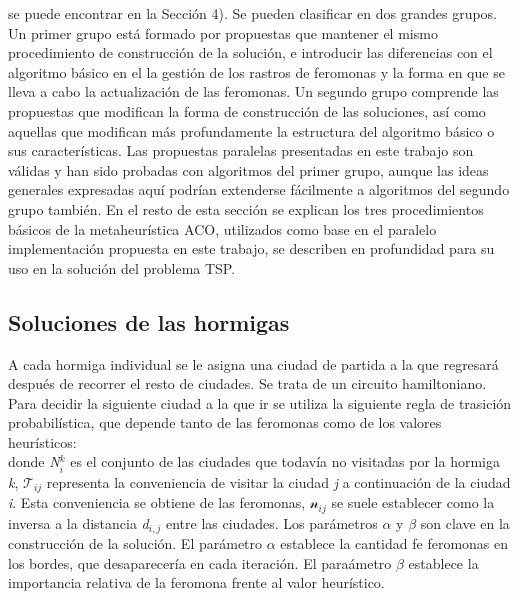se puede encontrar en la Secci\'on 4). Se pueden clasificar en dos grandes grupos. Un primer grupo est\'a formado por propuestas que
mantener el mismo procedimiento de construcci\'on de la soluci\'on, e introducir las diferencias con el algoritmo b\'asico en el
la gesti\'on de los rastros de feromonas y la forma en que se lleva a cabo la actualizaci\'on de las feromonas. Un segundo grupo comprende
las propuestas que modifican la forma de construcci\'on de las soluciones, as\'i como aquellas que modifican m\'as profundamente la
estructura del algoritmo b\'asico o sus caracter\'isticas. Las propuestas paralelas presentadas en este trabajo son v\'alidas y han sido
probadas con algoritmos del primer grupo, aunque las ideas generales expresadas aqu\'i podr\'ian extenderse f\'acilmente a
algoritmos del segundo grupo tambi\'en.
En el resto de esta secci\'on se explican los tres procedimientos b\'asicos de la metaheur\'istica ACO, utilizados como base en el paralelo
implementaci\'on propuesta en este trabajo, se describen en profundidad para su uso en la soluci\'on del problema TSP.
\subsection{Soluciones de las hormigas}
A cada hormiga individual se le asigna una ciudad de partida a la que regresar\'a despu\'es de recorrer el resto de ciudades. Se trata de un circuito hamiltoniano. Para decidir la siguiente ciudad a la que ir se utiliza la siguiente regla de trasici\'on probabil\'istica, que depende tanto de las feromonas como de los valores heur\'isticos:\\
donde \textit{N$^{k}_{i}$} es el conjunto de las ciudades que todav\'ia no visitadas por la hormiga \textit{k}, \textit{$\mathcal{T}_{ij}$} representa la conveniencia de visitar la ciudad \textit{j} a continuaci\'on de la ciudad \textit{i}. Esta conveniencia se obtiene de las feromonas, \textit{$\mathcal{n}_{ij}$} se suele establecer como la inversa a la distancia \textit{d$_{i,j}$} entre las ciudades. Los par\'ametros \textit{$\alpha$} y \textit{$\beta$} son clave en la construcci\'on de la soluci\'on. El par\'ametro \textit{$\alpha$} establece la cantidad fe feromonas en los bordes, que desaparecer\'ia en cada iteraci\'on. El para\'ametro \textit{$\beta$} establece la importancia relativa de la feromona frente al valor heur\'istico.\\
